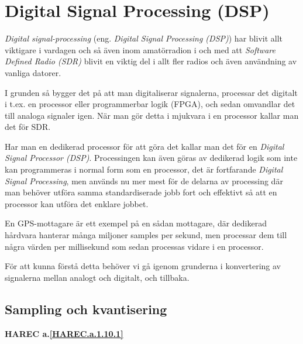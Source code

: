 \section{Digital Signal Processing (DSP)}

\begin{rev-nytt}[MAD]

\emph{Digital signal-processing} (eng. \emph{Digital Signal Processing (DSP)})
har blivit allt viktigare i vardagen och så även inom amatörradion i och med
att \emph{Software Defined Radio (SDR)} blivit en viktig del i allt fler
radios och även användning av vanliga datorer.

I grunden så bygger det på att man digitaliserar signalerna, processar det
digitalt i t.ex. en processor eller programmerbar logik (FPGA), och sedan
omvandlar det till analoga signaler igen. När man gör detta i mjukvara i en
processor kallar man det för SDR.

Har man en dedikerad processor för att göra det kallar man det för en
\emph{Digital Signal Processor (DSP)}. Processingen kan även göras av dedikerad
logik som inte kan programmeras i normal form som en processor, det är
fortfarande \emph{Digital Signal Processing}, men används
nu mer mest för de delarna av processing där man behöver utföra samma
standardiserade jobb fort och effektivt så att en processor kan utföra det
enklare jobbet.

En GPS-mottagare är ett exempel på en sådan mottagare, där dedikerad hårdvara
hanterar många miljoner samples per sekund, men processar dem till några värden
per millisekund som sedan processas vidare i en processor.

För att kunna förstå detta behöver vi gå igenom grunderna i konvertering av
signalerna mellan analogt och digitalt, och tillbaka.

\end{rev-nytt}

\subsection{Sampling och kvantisering}
\textbf{HAREC a.\ref{HAREC.a.1.10.1}\label{myHAREC.a.1.10.1}}


